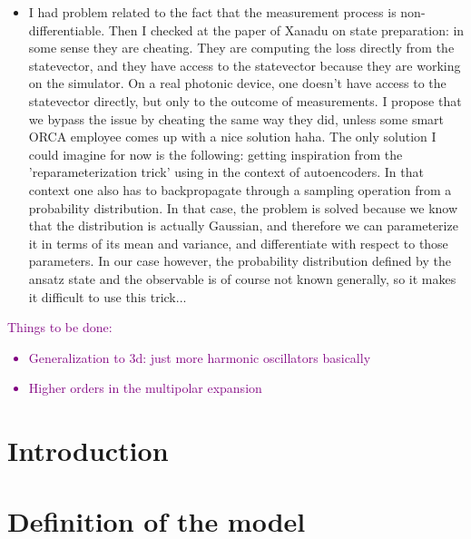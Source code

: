\documentclass[reprint, amsmath, amssymb, aps]{revtex4-2}
\begin{document}
{\begin{itemize}
        \item I had problem related to the fact that the measurement process is non-differentiable. Then I checked at the paper of Xanadu on state preparation: in some sense they are cheating. They are computing the loss directly from the statevector, and they have access to the statevector because they are working on the simulator. On a real photonic device, one doesn't have access to the statevector directly, but only to the outcome of measurements. I propose that we bypass the issue by cheating the same way they did, unless some smart ORCA employee comes up with a nice solution haha. The only solution I could imagine for now is the following: getting inspiration from the 'reparameterization trick' using in the context of autoencoders. In that context one also has to backpropagate through a sampling operation from a probability distribution. In that case, the problem is solved because we know that the distribution is actually Gaussian, and therefore we can parameterize it in terms of its mean and variance, and differentiate with respect to those parameters. In our case however, the probability distribution defined by the ansatz state and the observable is of course not known generally, so it makes it difficult to use this trick...
    \end{itemize}
}

\textcolor{purple}{
    Things to be done:
    \begin{itemize}
        \item Generalization to 3d: just more harmonic oscillators basically
        \item Higher orders in the multipolar expansion
    \end{itemize}
}

\section{Introduction}


\section{Definition of the model}
\end{document}
